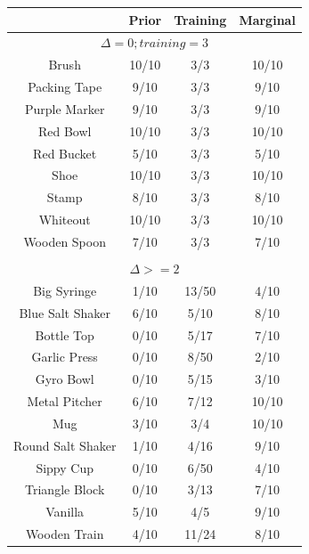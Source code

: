 \documentclass{article}
\newcommand{\algorithmCTxt}{Ordered Confidence Bound\xspace}
\begin{document}

\begin{table}
\small
\begin{tabular}{cccc}
\toprule
		    & Prior         &  Training     & Marginal\\
\midrule
\multicolumn{4}{c}{$\Delta = 0; training = 3$} \\
\midrule
Brush    	    & 10/10         &  3/3         &  10/10\\
Packing Tape        & 9/10          &  3/3         &  9/10 \\
Purple Marker       & 9/10          &  3/3         &  9/10 \\
Red Bowl    	    & 10/10         &  3/3         &  10/10\\
Red Bucket    	    & 5/10          &  3/3         &  5/10 \\
Shoe    	    & 10/10         &  3/3         &  10/10\\
Stamp    	    & 8/10          &  3/3         &  8/10 \\
Whiteout    	    & 10/10         &  3/3         &  10/10\\
Wooden Spoon        & 7/10          &  3/3         &  7/10 \\
\midrule
\\
\multicolumn{4}{c}{$\Delta >= 2$} \\
\midrule
Big Syringe    	    & 1/10          &  13/50       &  4/10 \\
Blue Salt Shaker    & 6/10          &  5/10        &  8/10 \\
Bottle Top    	    & 0/10          &  5/17        &  7/10 \\
Garlic Press        & 0/10          &  8/50        &  2/10 \\
Gyro Bowl    	    & 0/10          &  5/15        &  3/10 \\
Metal Pitcher       & 6/10          &  7/12        &  10/10\\
Mug    		    & 3/10          &  3/4         &  10/10\\
Round Salt Shaker   & 1/10          &  4/16        &  9/10 \\
Sippy Cup    	    & 0/10          &  6/50        &  4/10 \\
Triangle Block      & 0/10          &  3/13        &  7/10 \\
Vanilla	   	    & 5/10          &  4/5         &  9/10 \\
Wooden Train        & 4/10          &  11/24       &  8/10 \\


\end{tabular}
\end{table}
\end{document}
